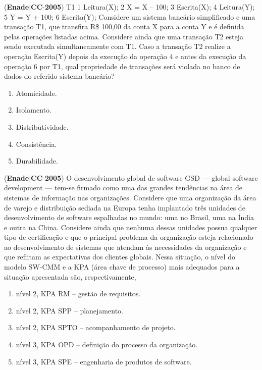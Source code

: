 \documentclass{exam}
\begin{document}
\begin{questions}
\begin{enumerate}[label=\alph*)]
	\end{enumerate}

\question (\textbf{Enade}$|$\textbf{CC}-\textbf{2005}) T1
1 Leitura(X);
2 X = X – 100;
3 Escrita(X);
4 Leitura(Y);
5 Y = Y + 100;
6 Escrita(Y);
Considere um sistema bancário simplificado e uma transação T1,
que transfira R\$ 100,00 da conta X para a conta Y e é definida
pelas operações listadas acima. Considere ainda que uma transação
T2 esteja sendo executada simultaneamente com T1. Caso a
transação T2 realize a operação Escrita(Y) depois da execução
da operação 4 e antes da execução da operação 6 por T1, qual
propriedade de transações será violada no banco de dados do
referido sistema bancário?
	\begin{enumerate}[label=\alph*)]
		\item  Atomicidade.
		\item  Isolamento.
		\item  Distributividade.
		\item  Consistência.
		\item  Durabilidade.

	\end{enumerate}

\question (\textbf{Enade}$|$\textbf{CC}-\textbf{2005}) O desenvolvimento global de software GSD — global
software development — tem-se firmado como uma das
grandes tendências na área de sistemas de informação nas
organizações. Considere que uma organização da área de
varejo e distribuição sediada na Europa tenha implantado três
unidades de desenvolvimento de software espalhadas no
mundo: uma no Brasil, uma na Índia e outra na China.
Considere ainda que nenhuma dessas unidades possua
qualquer tipo de certificação e que o principal problema da
organização esteja relacionado ao desenvolvimento de
sistemas que atendam às necessidades da organização e que
reflitam as expectativas dos clientes globais.
Nessa situação, o nível do modelo SW-CMM e a KPA (área chave
de processo) mais adequados para a situação apresentada são,
respectivamente,
	\begin{enumerate}[label=\alph*)]
		\item  nível 2, KPA RM – gestão de requisitos.
		\item  nível 2, KPA SPP – planejamento.
		\item  nível 2, KPA SPTO – acompanhamento de projeto.
		\item  nível 3, KPA OPD – definição do processo da organização.
		\item  nível 3, KPA SPE – engenharia de produtos de software.


\end{enumerate}
\end{questions}
\end{document}
